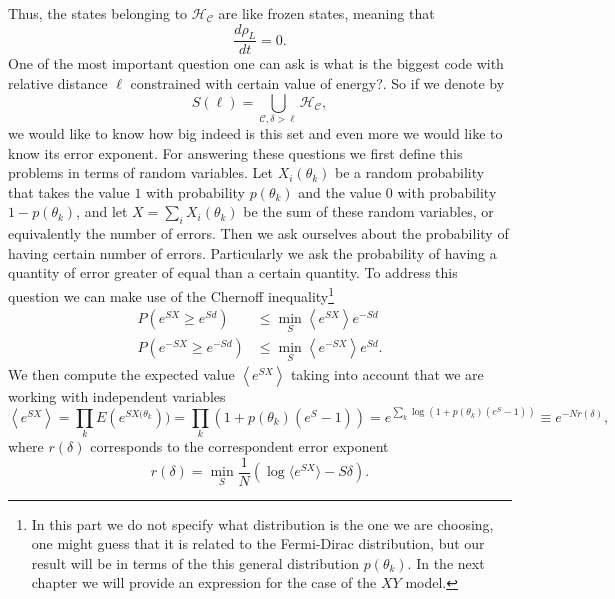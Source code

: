 Thus, the states belonging to $ \mathcal{H}_{\mathcal{C}}$ are like frozen states, meaning that
\begin{equation}
\frac{d\rho_L}{dt}=0.
\end{equation}
One of the most important question one can ask is what is the biggest code with relative distance $\ell$ constrained with certain value of energy?. So if we denote by
\begin{equation}
S(\ell) = \bigcup_{\mathcal{C}, \delta>\ell}\mathcal{H}_{\mathcal{C}},
\end{equation} 
we would like to know how big indeed is this set and even more we would like to know its error exponent. For answering these questions we first define this problems in terms of random variables. Let $X_i(\theta_k)$ be a random probability that takes the value $1$ with probability $p(\theta_k)$ and the value $0$ with probability $1-p(\theta_k)$, and let $X=\sum_{i}X_i(\theta_k)$ be the sum of these random variables, or equivalently the number of errors. Then we ask ourselves about the probability of having certain number of errors. Particularly we ask the probability of having a quantity of error greater of equal than a certain quantity. To address this question we can make use of the Chernoff inequality\footnote{In this part we do not specify what distribution is the one we are choosing, one might guess that it is related to the Fermi-Dirac distribution, but our result will be in terms of the this general distribution $p(\theta_k)$. In the next chapter we will provide an expression for the case of the $XY$ model.} 
\begin{equation}
\begin{aligned}
P(e^{S X}\geq e^{S d})&\leq \min_{S}\left\langle e^{S X}\right\rangle e^{-S d}\\
P(e^{-S X}\geq e^{-S d})&\leq \min_{S}\left\langle e^{-S X}\right\rangle e^{S d}.
\end{aligned}
\end{equation}
We then compute the expected value $\left\langle e^{S X}\right\rangle$ taking into account that we are working with independent variables
\begin{equation}
\left\langle e^{S X}\right\rangle = \prod_{k}  E(e^{S X(\theta_k})) = \prod_k \left(1+p(\theta_k)(e^S -1)\right) = e^{\sum_{k}\log(1+p(\theta_k)(e^S -1))}\equiv e^{-Nr(\delta)},
\end{equation}
where $r(\delta)$ corresponds to the correspondent error exponent
\begin{equation}
r(\delta) = \min_{S} \frac{1}{N} \left(\log\langle e^{SX}\rangle - S\delta\right).
\end{equation}
